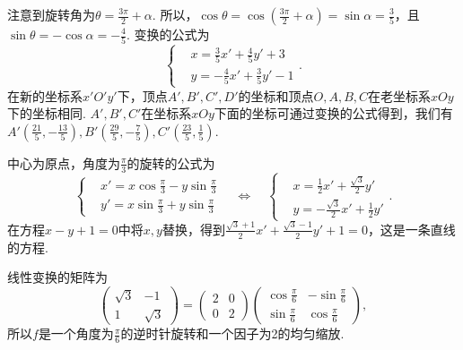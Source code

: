 \begin{solution}
  注意到旋转角为$\theta=\frac{3\pi}2+\alpha$. 所以，$\cos\theta=\cos\left(\frac{3\pi}2+\alpha\right)=
  \sin\alpha=\frac35$，且$\sin\theta=-\cos\alpha=-\frac45$. 变换的公式为
  \[
     \left\{
       \begin{aligned}
         & x = \frac35x' + \frac45y' + 3 \\
         & y = - \frac45x' + \frac35y' - 1
       \end{aligned}
     \right..
  \]
  在新的坐标系$x'O'y'$下，顶点$A',B',C',D'$的坐标和顶点$O,A,B,C$在老坐标系$xOy$下的坐标相同. $A',B',C'$在坐标系$xOy$下面的坐标可通过变换的公式得到，我们有$A'\left(\frac{21}5,-\frac{13}5\right),
  B'\left(\frac{29}5,-\frac75\right),C'\left(\frac{23}5
  ,\frac15\right)$.
\end{solution}

\begin{solution}
  中心为原点，角度为$\frac\pi3$的旋转的公式为
  \[
    \left\{
      \begin{aligned}
        & x' = x\cos\frac\pi3 - y\sin\frac\pi3 \\
        & y' = x\sin\frac\pi3 + y\sin\frac\pi3
      \end{aligned}
    \right. \quad \Leftrightarrow \quad
    \left\{
      \begin{aligned}
        & x = \frac12x' + \frac{\sqrt3}2y' \\
        & y = -\frac{\sqrt3}2x' + \frac12y'
      \end{aligned}
    \right..
  \]
  在方程$x-y+1=0$中将$x,y$替换，得到$\frac{\sqrt3+1}2x'+\frac{\sqrt3-1}2y'+1=0$，这是一条直线的方程.
\end{solution}

\begin{solution}
  线性变换的矩阵为
  \[
    \begin{pmatrix}
      \sqrt3 & -1 \\
      1 & \sqrt3
    \end{pmatrix} =
    \begin{pmatrix}
      2 & 0 \\
      0 & 2
    \end{pmatrix}
    \begin{pmatrix}
      \cos\frac\pi6 & - \sin\frac\pi6 \\
      \sin\frac\pi6 & \cos\frac\pi6
    \end{pmatrix},
  \]
  所以$f$是一个角度为$\frac\pi6$的逆时针旋转和一个因子为2的均匀缩放.
\end{solution}

